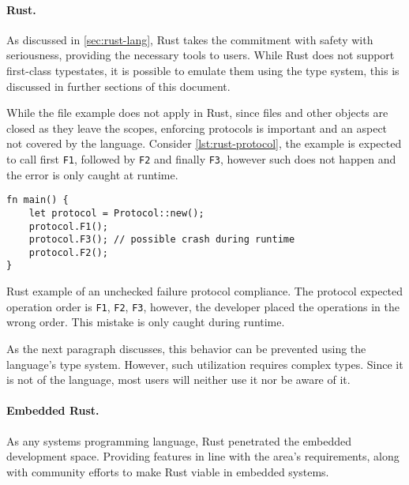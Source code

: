 






\paragraph{Rust.}
As discussed in \autoref{sec:rust-lang}, Rust takes the commitment with safety with seriousness,
providing the necessary tools to users. While Rust does not support first-class typestates,
it is possible to emulate them using the type system, this is discussed in further sections of this document.

While the file example does not apply in Rust, since files and other objects are closed as they leave the scopes,
enforcing protocols is important and an aspect not covered by the language.
Consider \autoref{lst:rust-protocol}, the example is expected to call first \texttt{F1}, followed by \texttt{F2} and finally \texttt{F3},
however such does not happen and the error is only caught at runtime.

% 

\begin{listing}
    \centering
    \begin{verbatim}
fn main() {
    let protocol = Protocol::new();
    protocol.F1();
    protocol.F3(); // possible crash during runtime
    protocol.F2();
}
    \end{verbatim}
    \caption{
        Rust example of an unchecked failure protocol compliance.
        The protocol expected operation order is \texttt{F1}, \texttt{F2}, \texttt{F3},
        however, the developer placed the operations in the wrong order.
        This mistake is only caught during runtime.
    }
    \label{lst:rust-protocol}
\end{listing}

As the next paragraph discusses, this behavior can be prevented using the language's type system.
However, such utilization requires complex types.
Since it is not  of the language, most users will neither use it nor be aware of it.

\paragraph{Embedded Rust.} As any systems programming language, Rust penetrated the embedded development space.
Providing features in line with the area's requirements, along with community efforts to make Rust viable in embedded systems.

